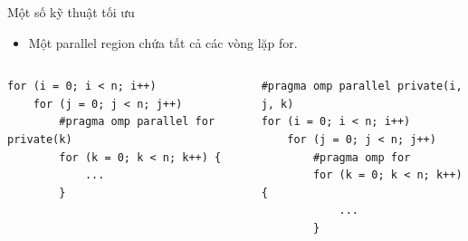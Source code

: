 \documentclass[10pt]{beamer}
\theoremstyle{remark}
\numberwithin{algocf}{section}
\numberwithin{equation}{section}
\numberwithin{dl}{section}
\numberwithin{figure}{section}
\begin{document}
\begin{frame}[fragile]{Một số kỹ thuật tối ưu}
    \begin{itemize}
        \item Một parallel region chứa tất cả các vòng lặp for.
    \end{itemize}
    \begin{columns}[onlytextwidth]
        \begin{column}{0.5\linewidth}
            \begin{verbatim}
for (i = 0; i < n; i++)
    for (j = 0; j < n; j++)
        #pragma omp parallel for private(k)
        for (k = 0; k < n; k++) {
            ...
        }
            \end{verbatim}
        \end{column}
        \begin{column}{0.5\linewidth}
            \begin{verbatim}
#pragma omp parallel private(i, j, k)
for (i = 0; i < n; i++)
    for (j = 0; j < n; j++)
        #pragma omp for
        for (k = 0; k < n; k++) {
            ...
        }
            \end{verbatim}
        \end{column}
    \end{columns}
\end{frame}
\end{document}
